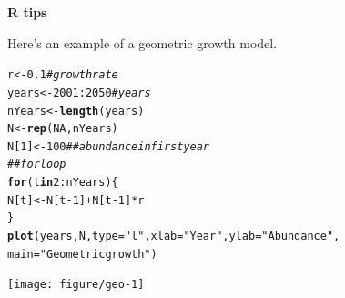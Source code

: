 \documentclass[12pt]{article}\usepackage[]{graphicx}\usepackage[]{xcolor}
\makeatletter
\newcommand{\hlnum}[1]{\textcolor[rgb]{0.686,0.059,0.569}{#1}}%
\newcommand{\hlsng}[1]{\textcolor[rgb]{0.192,0.494,0.8}{#1}}%
\newcommand{\hlcom}[1]{\textcolor[rgb]{0.678,0.584,0.686}{\textit{#1}}}%
\newcommand{\hlopt}[1]{\textcolor[rgb]{0,0,0}{#1}}%
\newcommand{\hldef}[1]{\textcolor[rgb]{0.345,0.345,0.345}{#1}}%
\newcommand{\hlkwa}[1]{\textcolor[rgb]{0.161,0.373,0.58}{\textbf{#1}}}%
\newcommand{\hlkwb}[1]{\textcolor[rgb]{0.69,0.353,0.396}{#1}}%
\newcommand{\hlkwc}[1]{\textcolor[rgb]{0.333,0.667,0.333}{#1}}%
\newcommand{\hlkwd}[1]{\textcolor[rgb]{0.737,0.353,0.396}{\textbf{#1}}}%
\newenvironment{kframe}{%
 \def\at@end@of@kframe{}%
 \ifinner\ifhmode%
  \def\at@end@of@kframe{\end{minipage}}%
  \begin{minipage}{\columnwidth}%
 \fi\fi%
 \def\FrameCommand##1{\hskip\@totalleftmargin \hskip-\fboxsep
 \colorbox{shadecolor}{##1}\hskip-\fboxsep
     \hskip-\linewidth \hskip-\@totalleftmargin \hskip\columnwidth}%
 \MakeFramed {\advance\hsize-\width
   \@totalleftmargin\z@ \linewidth\hsize
   \@setminipage}}%
 {\par\unskip\endMakeFramed%
 \at@end@of@kframe}
\newenvironment{knitrout}{}{} %
\makeatother
\begin{document}
\newpage

{\bf R tips \\}


Here's an example of a geometric growth model.
\begin{knitrout}\small
{}\color{fgcolor}\begin{kframe}
\begin{alltt}
\hldef{r} \hlkwb{<-} \hlnum{0.1}                \hlcom{# growth rate}
\hldef{years} \hlkwb{<-} \hlnum{2001}\hlopt{:}\hlnum{2050}      \hlcom{# years}
\hldef{nYears} \hlkwb{<-} \hlkwd{length}\hldef{(years)}
\hldef{N} \hlkwb{<-} \hlkwd{rep}\hldef{(}\hlnum{NA}\hldef{, nYears)}
\hldef{N[}\hlnum{1}\hldef{]} \hlkwb{<-} \hlnum{100}             \hlcom{## abundance in first year}
\hlcom{## for loop}
\hlkwa{for}\hldef{(t} \hlkwa{in} \hlnum{2}\hlopt{:}\hldef{nYears) \{}
    \hldef{N[t]} \hlkwb{<-} \hldef{N[t}\hlopt{-}\hlnum{1}\hldef{]} \hlopt{+} \hldef{N[t}\hlopt{-}\hlnum{1}\hldef{]}\hlopt{*}\hldef{r}
\hldef{\}}
\hlkwd{plot}\hldef{(years, N,} \hlkwc{type}\hldef{=}\hlsng{"l"}\hldef{,} \hlkwc{xlab}\hldef{=}\hlsng{"Year"}\hldef{,} \hlkwc{ylab}\hldef{=}\hlsng{"Abundance"}\hldef{,}
     \hlkwc{main}\hldef{=}\hlsng{"Geometric growth"}\hldef{)}
\end{alltt}
\end{kframe}

{\centering \texttt{[image: figure/geo-1]} 

}


\end{knitrout}



\end{document}
